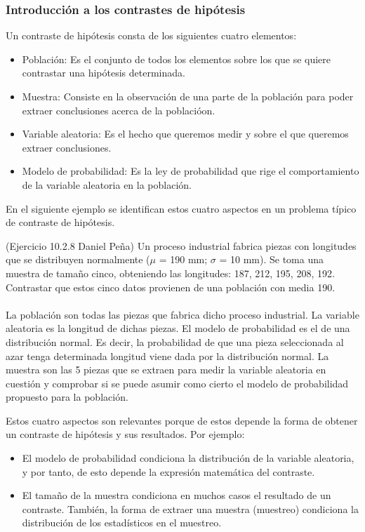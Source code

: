 \subsubsection{Introducción a los contrastes de hipótesis}
Un contraste de hipótesis consta de los siguientes cuatro elementos:
\begin{itemize}
	\item Población: Es el conjunto de todos los elementos sobre los que se quiere contrastar una hipótesis determinada.
	\item Muestra: Consiste en la observación de una parte de la población para poder extraer conclusiones acerca de la poblacióon.
	\item Variable aleatoria: Es el hecho que queremos medir y sobre el que queremos extraer conclusiones.
	\item Modelo de probabilidad: Es la ley de probabilidad que rige el comportamiento de la variable aleatoria en la población.
\end{itemize}
En el siguiente ejemplo se identifican estos cuatro aspectos en un problema típico de contraste de hipótesis. 
\begin{example}(Ejercicio 10.2.8 Daniel Peña)
Un proceso industrial fabrica piezas con longitudes que se distribuyen normalmente ($\mu$ = 190 mm; $\sigma$ = 10 mm). Se toma una muestra de tamaño cinco, obteniendo las longitudes: 187, 212, 195, 208, 192. Contrastar que estos cinco datos provienen de una población con media 190.\\\\
La población son todas las piezas que fabrica dicho proceso industrial. La variable aleatoria es la longitud de dichas piezas. El modelo de probabilidad es el de una distribución normal. Es decir, la probabilidad de que una pieza seleccionada al azar tenga determinada longitud viene dada por la distribución normal. La muestra son las 5 piezas que se extraen para medir la variable aleatoria en cuestión y comprobar si se puede asumir como cierto el modelo de probabilidad propuesto para la población.\label{ex: contraste}
\end{example}
Estos cuatro aspectos son relevantes porque de estos depende la forma de obtener un contraste de hipótesis y sus resultados. Por ejemplo:
\begin{itemize}
	\item El modelo de probabilidad condiciona la distribución de la variable aleatoria, y por tanto, de esto depende la expresión matemática del contraste.
	\item El tamaño de la muestra condiciona en muchos casos el resultado de un contraste. También, la forma de extraer una muestra (muestreo) condiciona la distribución de los estadísticos en el muestreo.
\end{itemize}
